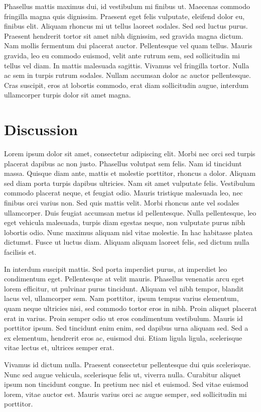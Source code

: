 \documentclass[conference]{IEEEtran}
\begin{document}
Phasellus mattis maximus dui, id vestibulum mi finibus ut. Maecenas commodo fringilla magna quis dignissim. Praesent eget felis vulputate, eleifend dolor eu, finibus elit. Aliquam rhoncus mi ut tellus laoreet sodales. Sed sed luctus purus. Praesent hendrerit tortor sit amet nibh dignissim, sed gravida magna dictum. Nam mollis fermentum dui placerat auctor. Pellentesque vel quam tellus. Mauris gravida, leo eu commodo euismod, velit ante rutrum sem, sed sollicitudin mi tellus vel diam. In mattis malesuada sagittis. Vivamus vel fringilla tortor. Nulla ac sem in turpis rutrum sodales. Nullam accumsan dolor ac auctor pellentesque. Cras suscipit, eros at lobortis commodo, erat diam sollicitudin augue, interdum ullamcorper turpis dolor sit amet magna. 

\section{Discussion}

Lorem ipsum dolor sit amet, consectetur adipiscing elit. Morbi nec orci sed turpis placerat dapibus ac non justo. Phasellus volutpat sem felis. Nam id tincidunt massa. Quisque diam ante, mattis et molestie porttitor, rhoncus a dolor. Aliquam sed diam porta turpis dapibus ultricies. Nam sit amet vulputate felis. Vestibulum commodo placerat neque, et feugiat odio. Mauris tristique malesuada leo, nec finibus orci varius non. Sed quis mattis velit. Morbi rhoncus ante vel sodales ullamcorper. Duis feugiat accumsan metus id pellentesque. Nulla pellentesque, leo eget vehicula malesuada, turpis diam egestas neque, non vulputate purus nibh lobortis odio. Nunc maximus aliquam nisl vitae molestie. In hac habitasse platea dictumst. Fusce ut luctus diam. Aliquam aliquam laoreet felis, sed dictum nulla facilisis et.

In interdum suscipit mattis. Sed porta imperdiet purus, at imperdiet leo condimentum eget. Pellentesque at velit mauris. Phasellus venenatis arcu eget lorem efficitur, ut pulvinar purus tincidunt. Aliquam vel nibh tempor, blandit lacus vel, ullamcorper sem. Nam porttitor, ipsum tempus varius elementum, quam neque ultricies nisi, sed commodo tortor eros in nibh. Proin aliquet placerat erat in varius. Proin semper odio ut eros condimentum vestibulum. Mauris id porttitor ipsum. Sed tincidunt enim enim, sed dapibus urna aliquam sed. Sed a ex elementum, hendrerit eros ac, euismod dui. Etiam ligula ligula, scelerisque vitae lectus et, ultrices semper erat.

Vivamus id dictum nulla. Praesent consectetur pellentesque dui quis scelerisque. Nunc sed augue vehicula, scelerisque felis ut, viverra nulla. Curabitur aliquet ipsum non tincidunt congue. In pretium nec nisl et euismod. Sed vitae euismod lorem, vitae auctor est. Mauris varius orci ac augue semper, sed sollicitudin mi porttitor.
\end{document}
